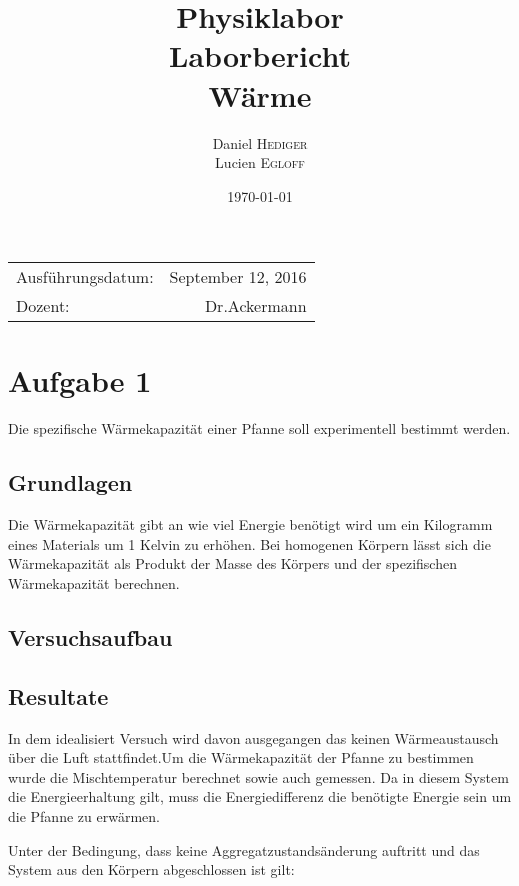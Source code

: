 \documentclass{article}
\title{Physiklabor \\ Laborbericht \\ Wärme} %
\author{Daniel \textsc{Hediger} \\ Lucien \textsc{Egloff}} %
\date{\today} %
\begin{document}
\maketitle %

\begin{center}
\begin{tabular}{l r}
Ausführungsdatum: & September 12, 2016 \\ %
Dozent: & Dr.Ackermann %
\end{tabular}
\end{center}
\newpage
\tableofcontents 

\newpage
\section{Aufgabe 1}
Die spezifische Wärmekapazität einer Pfanne soll experimentell bestimmt werden.
\subsection{Grundlagen}
Die Wärmekapazität gibt an wie viel Energie benötigt wird um ein Kilogramm eines Materials um 1 Kelvin zu erhöhen.
Bei homogenen Körpern lässt sich die Wärmekapazität als Produkt der Masse des Körpers und der spezifischen Wärmekapazität berechnen.
\subsection{Versuchsaufbau}
\subsection{Resultate}
In dem idealisiert Versuch wird davon ausgegangen das keinen Wärmeaustausch über die Luft stattfindet.Um die Wärmekapazität der Pfanne zu bestimmen wurde die Mischtemperatur berechnet sowie auch gemessen. Da in diesem System die Energieerhaltung gilt, muss die Energiedifferenz die benötigte Energie sein um die Pfanne zu erwärmen.

Unter der Bedingung, dass keine Aggregatzustandsänderung auftritt und das System aus den Körpern abgeschlossen ist gilt:
\end{document}
